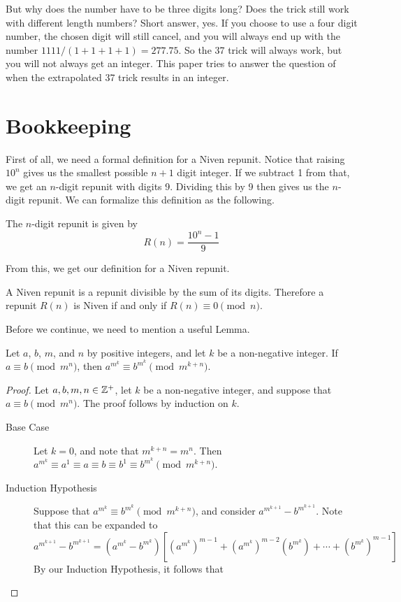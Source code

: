\documentclass{amsart}
\begin{document}
But why does the number have to be three digits long? Does the trick still work with different length numbers? Short answer, yes. If you choose to use a four digit number, the chosen digit will still cancel, and you will always end up with the number $1111/(1+1+1+1)=277.75$. So the 37 trick will always work, but you will not always get an integer. This paper tries to answer the question of when the extrapolated 37 trick results in an integer.

\section{Bookkeeping}

First of all, we need a formal definition for a Niven repunit. Notice that raising $10^n$ gives us the smallest possible $n+1$ digit integer. If we subtract 1 from that, we get an $n$-digit repunit with digits 9. Dividing this by 9 then gives us the $n$-digit repunit. We can formalize this definition as the following.

\begin{definition}
\label{repunit}
The $n$-digit repunit is given by
\begin{equation}
\label{repuniteq}
    R(n)=\frac{10^n-1}{9}
\end{equation}
\end{definition}

From this, we get our definition for a Niven repunit.

\begin{definition}
\label{nivenrepunit}
A Niven repunit is a repunit divisible by the sum of its digits. Therefore a repunit $R(n)$ is Niven if and only if $R(n)\equiv0\pmod{n}$.
\end{definition}

Before we continue, we need to mention a useful Lemma.

\begin{lemma}
\label{useful lemma}
Let $a$, $b$, $m$, and $n$ by positive integers, and let $k$ be a non-negative integer. If $a\equiv b\pmod{m^n}$, then $a^{m^k}\equiv b^{m^k}\pmod{m^{k+n}}$.

\begin{proof}
Let $a,b,m,n\in\mathbb{Z}^+$, let $k$ be a non-negative integer, and suppose that $a\equiv b\pmod{m^n}$. The proof follows by induction on $k$.
\begin{description}
\item[Base Case] Let $k=0$, and note that $m^{k+n}=m^n$. Then $a^{m^k}\equiv a^1\equiv a\equiv b\equiv b^1\equiv b^{m^k}\pmod{m^{k+n}}$.

\vspace{5pt}

\item[Induction Hypothesis] Suppose that $a^{m^k}\equiv b^{m^k}\pmod{m^{k+n}}$, and consider $a^{m^{k+1}}-b^{m^{k+1}}$. Note that this can be expanded to \[a^{m^{k+1}}-b^{m^{k+1}}=\left(a^{m^k}-b^{m^k}\right)\left[\left(a^{m^k}\right)^{m-1}+\left(a^{m^k}\right)^{m-2}\left(b^{m^k}\right)+\cdots+\left(b^{m^k}\right)^{m-1}\right]\] By our Induction Hypothesis, it follows that 
\end{description}
\end{proof}
\end{lemma}

\nocite{*}
\printbibliography[title=References]
\end{document}

